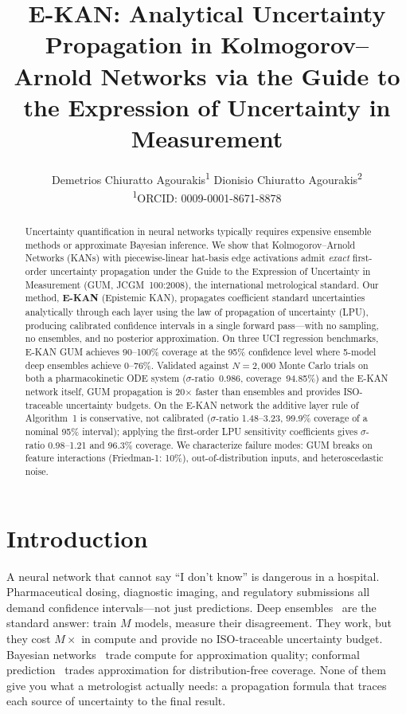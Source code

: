 \documentclass{article}
\title{E-KAN: Analytical Uncertainty Propagation in Kolmogorov--Arnold Networks via the Guide to the Expression of Uncertainty in Measurement}
\author{%
  Demetrios Chiuratto Agourakis\textsuperscript{1}\quad
  Dionisio Chiuratto Agourakis\textsuperscript{2}\\[4pt]
  \textsuperscript{1}ORCID: 0009-0001-8671-8878
}
\begin{document}
\maketitle

\begin{abstract}
Uncertainty quantification in neural networks typically requires expensive
ensemble methods or approximate Bayesian inference.  We show that
Kolmogorov--Arnold Networks (KANs) with piecewise-linear hat-basis edge
activations admit \emph{exact} first-order uncertainty propagation under the
Guide to the Expression of Uncertainty in Measurement (GUM, JCGM~100:2008),
the international metrological standard.  Our method, \textbf{E-KAN}
(Epistemic KAN), propagates coefficient standard uncertainties analytically
through each layer using the law of propagation of uncertainty (LPU), producing
calibrated confidence intervals in a single forward pass---with no sampling,
no ensembles, and no posterior approximation.  On three UCI regression
benchmarks, E-KAN GUM achieves 90--100\% coverage at the 95\% confidence
level where 5-model deep ensembles achieve 0--76\%.  Validated against
$N{=}2{,}000$ Monte Carlo trials on both a pharmacokinetic ODE system
($\sigma$-ratio~0.986, coverage~94.85\%) and the E-KAN network itself,
GUM propagation is 20$\times$ faster than ensembles and
provides ISO-traceable uncertainty budgets.  On the E-KAN network the
additive layer rule of Algorithm~1 is conservative, not calibrated
($\sigma$-ratio 1.48--3.23, 99.9\% coverage of a nominal 95\% interval);
applying the first-order LPU sensitivity coefficients gives $\sigma$-ratio
0.98--1.21 and 96.3\% coverage.  We characterize failure modes:
GUM breaks on feature interactions (Friedman-1: 10\%), out-of-distribution
inputs, and heteroscedastic noise.
\end{abstract}

\section{Introduction}
\label{sec:intro}

A neural network that cannot say ``I don't know'' is dangerous in a hospital.
Pharmaceutical dosing, diagnostic imaging, and regulatory submissions all
demand confidence intervals---not just predictions.
Deep ensembles~\citep{lakshminarayanan2017} are the standard answer: train
$M$ models, measure their disagreement.
They work, but they cost $M\times$ in compute and provide no
ISO-traceable uncertainty budget.
Bayesian networks~\citep{blundell2015} trade compute for approximation
quality; conformal prediction~\citep{shafer2008conformal} trades
approximation for distribution-free coverage.
None of them give you what a metrologist actually needs: a propagation formula
that traces each source of uncertainty to the final result.
\end{document}
